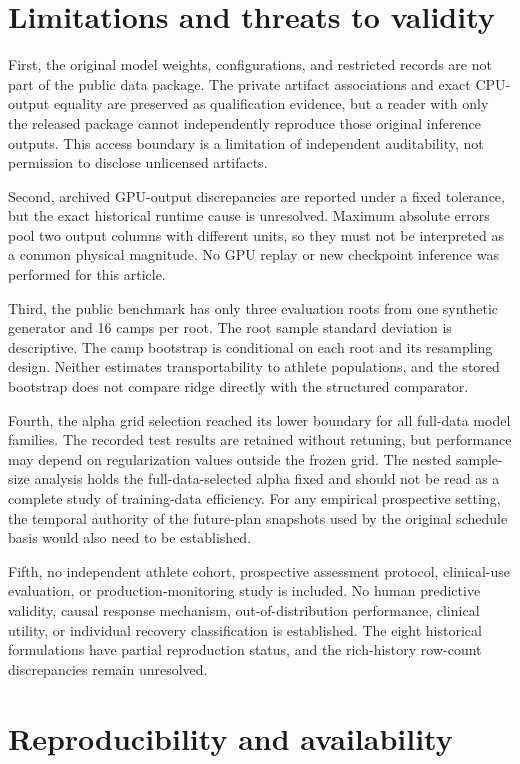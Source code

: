 \documentclass[12pt,a4paper]{article}
\begin{document}
\section{Limitations and threats to validity}

First, the original model weights, configurations, and restricted records are not part of the public data package. The private artifact associations and exact CPU-output equality are preserved as qualification evidence, but a reader with only the released package cannot independently reproduce those original inference outputs. This access boundary is a limitation of independent auditability, not permission to disclose unlicensed artifacts.

Second, archived GPU-output discrepancies are reported under a fixed tolerance, but the exact historical runtime cause is unresolved. Maximum absolute errors pool two output columns with different units, so they must not be interpreted as a common physical magnitude. No GPU replay or new checkpoint inference was performed for this article.

Third, the public benchmark has only three evaluation roots from one synthetic generator and 16 camps per root. The root sample standard deviation is descriptive. The camp bootstrap is conditional on each root and its resampling design. Neither estimates transportability to athlete populations, and the stored bootstrap does not compare ridge directly with the structured comparator.

Fourth, the alpha grid selection reached its lower boundary for all full-data model families. The recorded test results are retained without retuning, but performance may depend on regularization values outside the frozen grid. The nested sample-size analysis holds the full-data-selected alpha fixed and should not be read as a complete study of training-data efficiency. For any empirical prospective setting, the temporal authority of the future-plan snapshots used by the original schedule basis would also need to be established.

Fifth, no independent athlete cohort, prospective assessment protocol, clinical-use evaluation, or production-monitoring study is included. No human predictive validity, causal response mechanism, out-of-distribution performance, clinical utility, or individual recovery classification is established. The eight historical formulations have partial reproduction status, and the rich-history row-count discrepancies remain unresolved.

\section{Reproducibility and availability}
\end{document}
